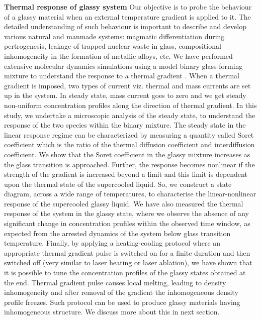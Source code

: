 \vskip 1.0cm
{\bf {\large Thermal response of glassy system}}
\vskip 0.3cm
Our objective is to probe the behaviour of a glassy material when an external temperature gradient is applied to it. The detailed understanding of such behaviour is important to describe and develop various natural and manmade systems: magmatic differentiation during pertrogenesis, leakage of trapped nuclear waste in glass, compositional inhomogeneity in the formation of metallic alloys, etc. We have performed extensive molecular dynamics simulations using a model binary glass-forming mixture \cite{kob1995testing} to understand the response to a thermal gradient \cite{vaibhav2020response}. When a thermal gradient is imposed, two types of current viz. thermal and mass currents are set up in the system. In steady state, mass current goes to zero and we get steady non-uniform concentration profiles along the direction of thermal gradient. In this study, we undertake a microscopic analysis of the steady state, to understand the response of the two species within the binary mixture.  The steady state in the linear response regime can be characterized by measuring a quantity called Soret coefficient which is the ratio of the thermal diffusion coefficient and interdiffusion coefficient. We show that the Soret coefficient in the glassy mixture increases as the glass transition is approached. Further, the response becomes nonlinear if the strength of the gradient is increased beyond a limit and this limit is dependent upon the thermal state of the supercooled liquid. So, we construct a state diagram, across a wide range of temperatures, to characterise the linear-nonlinear response of the supercooled glassy liquid. We have also measured the thermal response of the system in the glassy state, where we observe the absence of any significant change in concentration profiles within the observed time window, as expected from the arrested dynamics of the system below glass transition temperature. Finally, by applying a heating-cooling protocol where an appropriate thermal gradient pulse is switched on for a finite duration and then switched off (very similar to laser heating or laser ablation), we have shown that it is possible to tune the concentration profiles of the glassy states obtained at the end. Thermal gradient pulse causes local melting, leading to density inhomogeneity and after removal of the gradient the inhomogeneous density profile freezes. Such protocol can be used to produce glassy materials having inhomogeneous structure. We discuss more about this in next section.

